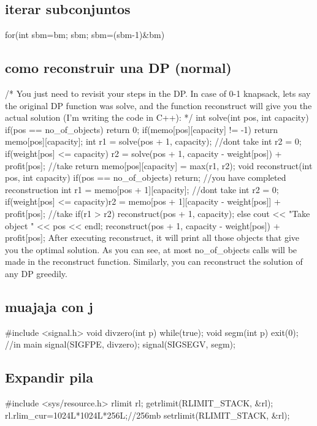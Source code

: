 \subsection{iterar subconjuntos}
\begin{code}
for(int sbm=bm; sbm; sbm=(sbm-1)&bm)
\end{code}

\subsection{como reconstruir una DP (normal)}
\begin{code}
/*
You just need to revisit your steps in the DP. In case of 0-1 knapsack, lets say the original DP function was solve, and the function reconstruct will give you the actual solution (I'm writing the code in C++):
*/
int solve(int pos, int capacity){
    if(pos == no_of_objects) return 0;
    if(memo[pos][capacity] != -1) return memo[pos][capacity];
    int r1 = solve(pos + 1, capacity); //dont take
    int r2 = 0;
    if(weight[pos] <= capacity){
        r2 = solve(pos + 1, capacity - weight[pos]) + profit[pos]; //take
    }
    return memo[pos][capacity] = max(r1, r2);
}
void reconstruct(int pos, int capacity){
    if(pos == no_of_objects) return; //you have completed reconstruction
    int r1 = memo[pos + 1][capacity]; //dont take
    int r2 = 0;
    if(weight[pos] <= capacity)r2 = memo[pos + 1][capacity - weight[pos]] + profit[pos]; //take
    if(r1 > r2) {reconstruct(pos + 1, capacity);}
    else{
      	cout << "Take object " << pos << endl;
        reconstruct(pos + 1, capacity - weight[pos]) + profit[pos]; 
    }
}
After executing reconstruct, it will print all those objects that give you the optimal solution. As you can see, at most no_of_objects calls will be made in the reconstruct function. 
Similarly, you can reconstruct the solution of any DP greedily.
\end{code}
\subsection{muajaja con j}
\begin{code}
#include <signal.h>
void divzero(int p){
	while(true);}
void segm(int p){
	exit(0);}
//in main
signal(SIGFPE, divzero);
signal(SIGSEGV, segm);
\end{code}
\subsection*{Expandir pila}
\begin{code}
#include <sys/resource.h>
rlimit rl;
getrlimit(RLIMIT_STACK, &rl);
rl.rlim_cur=1024L*1024L*256L;//256mb
setrlimit(RLIMIT_STACK, &rl);
\end{code}

